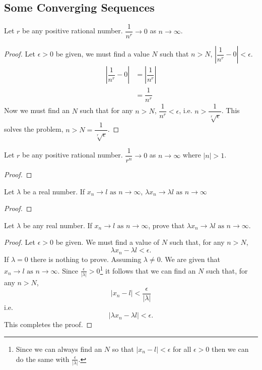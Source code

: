 \documentclass[10pt, a4paper]{article}
\newcommand{\limas}[3][n]{#2 \rightarrow #3 \text{ as } #1 \rightarrow \infty}
\begin{document}
\subsection{Some Converging Sequences}
\begin{theorem}
    Let $r$ be any positive rational number. $\dfrac{1}{n ^ r} \rightarrow 0$ as $n \rightarrow \infty$.
    \begin{proof}
        Let $\epsilon > 0$ be given, we must find a value $N$ such that $n > N$, $\left| \dfrac{1}{n ^ r} - 0 \right| < \epsilon$.
        \begin{align*}
            \left| \dfrac{1}{n ^ r} - 0 \right| &= \left| \dfrac{1}{n ^ r} \right| \\
            &= \dfrac{1}{n ^ r}
        \end{align*}
        Now we must find an $N$ such that for any $n > N$, $\dfrac{1}{n ^ r} < \epsilon$, i.e. $n > \dfrac{1}{\sqrt[r]{\epsilon}}$. This solves the problem, $n > N = \dfrac{1}{\sqrt[r]{\epsilon}}$.
    \end{proof}
\end{theorem}

\begin{theorem}
    Let $r$ be any positive rational number. $\dfrac{1}{r ^ n} \rightarrow 0$ as $n \rightarrow \infty$ where $|n| > 1$.    
    \begin{proof}
        
    \end{proof}
\end{theorem}

\begin{theorem}
    Let $\lambda$ be a real number. If $\limas{x_n}{l}$, $\limas{\lambda x_n}{\lambda l}$
    \begin{proof}
        
    \end{proof}
\end{theorem}

\begin{example}\label{examp_limscale}
    Let $\lambda$ be any real number. If $\limas{x_n}{l}$, prove that $\limas{\lambda x_n}{\lambda l}$.
    \begin{proof}
        Let $\epsilon > 0$ be given. We must find a value of $N$ such that, for any $n > N$,
        $$\lambda x_n - \lambda l < \epsilon.$$
        If $\lambda = 0$ there is nothing to prove. Assuming $\lambda \neq 0$. We are given that $\limas{x_n}{l}$. Since $\frac{\epsilon}{|\lambda|} > 0$\footnote{Since we can always find an $N$ so that $|x_n - l| < \epsilon$ for all $\epsilon > 0$ then we can do the same with $\frac{\epsilon}{|\lambda|}$.} it follows that we can find an $N$ such that, for any $n > N$,
        $$|x_n - l| < \frac{\epsilon}{|\lambda|}$$
        i.e.
        $$|\lambda x_n - \lambda l| < \epsilon.$$
        This completes the proof.
    \end{proof}
\end{example}
\end{document}
